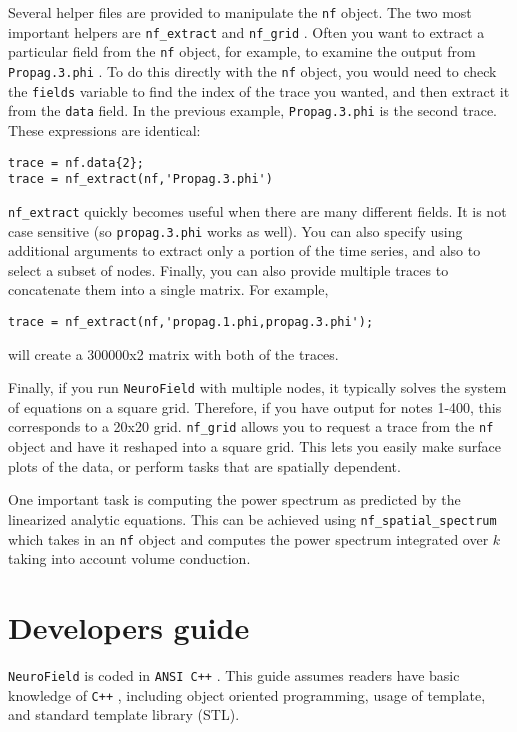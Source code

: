 \documentclass[12pt,a4paper]{article}
\newcommand{\type}[1]{ {\small\small\tt #1} }
\newcommand{\NF}[0]{ \type{NeuroField}}
\begin{document}
Several helper files are provided to manipulate the \type{nf} object. The two most important helpers are \type{nf\_extract} and \type{nf\_grid}. Often you want to extract a particular field from the \type{nf} object, for example, to examine the output from \type{Propag.3.phi}. To do this directly with the \type{nf} object, you would need to check the \type{fields} variable to find the index of the trace you wanted, and then extract it from the \type{data} field. In the previous example, \type{Propag.3.phi} is the second trace. These expressions are identical:
\begin{lstlisting}
trace = nf.data{2};
trace = nf_extract(nf,'Propag.3.phi')
\end{lstlisting}
\type{nf\_extract} quickly becomes useful when there are many different fields. It is not case sensitive (so \type{propag.3.phi} works as well). You can also specify using additional arguments to extract only a portion of the time series, and also to select a subset of nodes. Finally, you can also provide multiple traces to concatenate them into a single matrix. For example,
\begin{lstlisting}
trace = nf_extract(nf,'propag.1.phi,propag.3.phi');
\end{lstlisting}
will create a 300000x2 matrix with both of the traces. 

Finally, if you run \NF with multiple nodes, it typically solves the system of equations on a square grid. Therefore, if you have output for notes 1-400, this corresponds to a 20x20 grid. \type{nf\_grid} allows you to request a trace from the \type{nf} object and have it reshaped into a square grid. This lets you easily make surface plots of the data, or perform tasks that are spatially dependent. 

One important task is computing the power spectrum as predicted by the linearized analytic equations. This can be achieved using \type{nf\_spatial\_spectrum} which takes in an \type{nf} object and computes the power spectrum integrated over $k$ taking into account volume conduction. 

\pagebreak
\section{Developers guide}

\NF is coded in \type{ANSI C++}. This guide assumes readers have basic knowledge of \type{C++}, including object oriented programming, usage of template, and standard template library (STL). %
\end{document}
